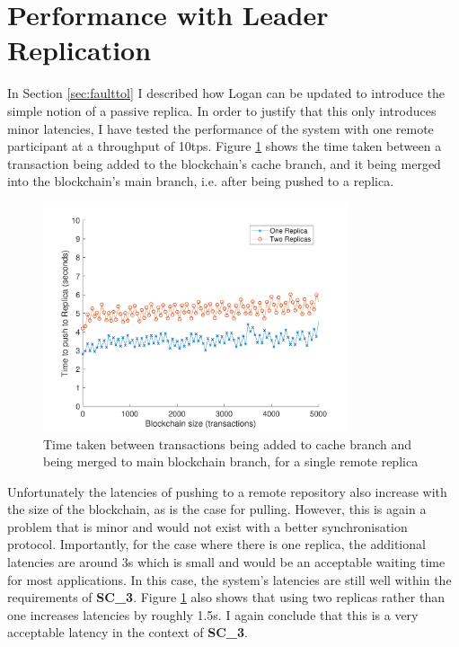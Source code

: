 \documentclass[12pt,a4paper,twoside,openright]{report}
\begin{document}
	\section{Performance with Leader Replication}
	In Section \ref{sec:faulttol} I described how Logan can be updated to introduce the simple notion of a passive replica. 
	In order to justify that this only introduces minor latencies, I have tested the performance of the system with one remote participant at a throughput of 10tps. 
	Figure \ref{figs:confirmationtimes}  shows the time taken between a transaction being added to the blockchain's cache branch, and it being merged into the blockchain's main branch, i.e. after being pushed to a replica.
	\begin{figure}
		\centering
		\includegraphics[width=0.8\textwidth]{figs/confirmationlatencies.pdf}
		\caption{Time taken between transactions being added to cache branch and being merged to main blockchain branch, for a single remote replica}
		\label{figs:confirmationtimes}
	\end{figure}
	Unfortunately the latencies of pushing to a remote repository also increase with the size of the blockchain, as is the case for pulling.
	However, this is again a problem that is minor and would not exist with a better synchronisation protocol. 
	Importantly, for the case where there is one replica, the additional latencies are around 3s which is small and would be an acceptable waiting time for most applications.
	In this case, the system's latencies are still well within the requirements of \textbf{SC\_3}.
	Figure \ref{figs:confirmationtimes} also shows that using two replicas rather than one increases latencies by roughly 1.5s. 
	I again conclude that this is a very acceptable latency in the context of \textbf{SC\_3}.\\
\end{document}
